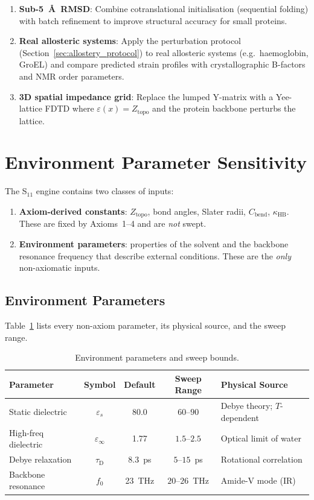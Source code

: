 \begin{enumerate}
\item \textbf{Sub-5~\AA\ RMSD}: Combine cotranslational initialisation
      (sequential folding) with batch refinement to improve structural
      accuracy for small proteins.
\item \textbf{Real allosteric systems}: Apply the perturbation
      protocol (Section~\ref{sec:allostery_protocol}) to real
      allosteric systems (e.g.\ haemoglobin, GroEL) and compare
      predicted strain profiles with crystallographic B-factors and
      NMR order parameters.
\item \textbf{3D spatial impedance grid}: Replace the lumped Y-matrix
      with a Yee-lattice FDTD where $\varepsilon(x) = Z_\text{topo}$
      and the protein backbone perturbs the lattice.
\end{enumerate}


\section{Environment Parameter Sensitivity}
\label{sec:env_sweep}

The S$_{11}$ engine contains two classes of inputs:
\begin{enumerate}
\item \textbf{Axiom-derived constants}: $Z_\text{topo}$, bond angles,
      Slater radii, $C_\text{bend}$, $\kappa_\text{HB}$.
      These are fixed by Axioms~1--4 and are \emph{not} swept.
\item \textbf{Environment parameters}: properties of the solvent
      and the backbone resonance frequency that describe external
      conditions.  These are the \emph{only} non-axiomatic inputs.
\end{enumerate}

\subsection{Environment Parameters}

Table~\ref{tab:env_params} lists every non-axiom parameter, its
physical source, and the sweep range.

\begin{table}[H]
\centering
\caption{Environment parameters and sweep bounds.}
\label{tab:env_params}
\begin{tabular}{l c c c l}
\toprule
Parameter & Symbol & Default & Sweep Range & Physical Source \\
\midrule
Static dielectric   & $\varepsilon_s$ & 80.0
    & $60$--$90$ & Debye theory; $T$-dependent \\
High-freq dielectric & $\varepsilon_\infty$ & 1.77
    & $1.5$--$2.5$ & Optical limit of water \\
Debye relaxation    & $\tau_\text{D}$ & 8.3~ps
    & $5$--$15$~ps & Rotational correlation \\
Backbone resonance  & $f_0$ & 23~THz
    & $20$--$26$~THz & Amide-V mode (IR) \\
\bottomrule
\end{tabular}
\end{table}

